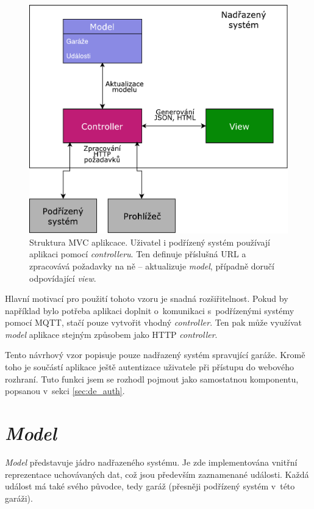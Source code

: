 \begin{figure}[h!]
    \centering
    \includegraphics[width=\textwidth]{images/mvc.pdf}
    \caption[Struktura MVC aplikace]{Struktura MVC aplikcace. Uživatel i podřízený systém používají aplikaci pomocí \textit{controlleru}. Ten definuje příslušná URL a zpracovává požadavky na ně -- aktualizuje \textit{model}, případně doručí odpovídající \textit{view}.}
    \label{fig:mvc}
\end{figure}

Hlavní motivací pro použití tohoto vzoru je snadná rozšiřitelnost. Pokud by například bylo potřeba aplikaci doplnit o~komunikaci s~podřízenými systémy pomocí MQTT, stačí pouze vytvořit vhodný \textit{controller}. Ten pak může využívat \textit{model} aplikace stejným způsobem jako HTTP \textit{controller}.

Tento návrhový vzor popisuje pouze nadřazený systém spravující garáže. Kromě toho je součástí aplikace ještě autentizace uživatele při přístupu do webového rozhraní. Tuto funkci jsem se rozhodl pojmout jako samostatnou komponentu, popsanou v~sekci \ref{sec:de_auth}.

\section{\textit{Model}}
\label{sec:de_model}

\textit{Model} představuje jádro nadřazeného systému. Je zde implementována vnitřní reprezentace uchovávaných dat, což jsou především zaznamenané události. Každá událost má také svého původce, tedy garáž (přesněji podřízený systém v~této garáži).


